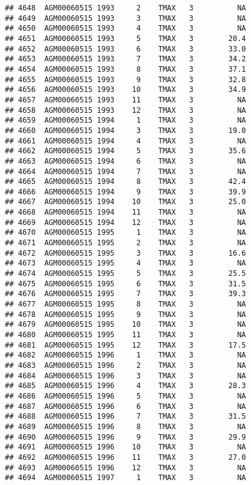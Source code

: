 \documentclass{article}\usepackage[]{graphicx}\usepackage[]{color}
\makeatletter
\newenvironment{kframe}{%
 \def\at@end@of@kframe{}%
 \ifinner\ifhmode%
  \def\at@end@of@kframe{\end{minipage}}%
  \begin{minipage}{\columnwidth}%
 \fi\fi%
 \def\FrameCommand##1{\hskip\@totalleftmargin \hskip-\fboxsep
 \colorbox{shadecolor}{##1}\hskip-\fboxsep
     \hskip-\linewidth \hskip-\@totalleftmargin \hskip\columnwidth}%
 \MakeFramed {\advance\hsize-\width
   \@totalleftmargin\z@ \linewidth\hsize
   \@setminipage}}%
 {\par\unskip\endMakeFramed%
 \at@end@of@kframe}
\newenvironment{knitrout}{}{} %
\makeatother
\begin{document}
\begin{knitrout}
\begin{kframe}
\begin{verbatim}
## 4648  AGM00060515 1993     2    TMAX   3          NA
## 4649  AGM00060515 1993     3    TMAX   3          NA
## 4650  AGM00060515 1993     4    TMAX   3          NA
## 4651  AGM00060515 1993     5    TMAX   3        20.4
## 4652  AGM00060515 1993     6    TMAX   3        33.0
## 4653  AGM00060515 1993     7    TMAX   3        34.2
## 4654  AGM00060515 1993     8    TMAX   3        37.1
## 4655  AGM00060515 1993     9    TMAX   3        32.8
## 4656  AGM00060515 1993    10    TMAX   3        34.9
## 4657  AGM00060515 1993    11    TMAX   3          NA
## 4658  AGM00060515 1993    12    TMAX   3          NA
## 4659  AGM00060515 1994     1    TMAX   3          NA
## 4660  AGM00060515 1994     3    TMAX   3        19.0
## 4661  AGM00060515 1994     4    TMAX   3          NA
## 4662  AGM00060515 1994     5    TMAX   3        35.6
## 4663  AGM00060515 1994     6    TMAX   3          NA
## 4664  AGM00060515 1994     7    TMAX   3          NA
## 4665  AGM00060515 1994     8    TMAX   3        42.4
## 4666  AGM00060515 1994     9    TMAX   3        39.9
## 4667  AGM00060515 1994    10    TMAX   3        25.0
## 4668  AGM00060515 1994    11    TMAX   3          NA
## 4669  AGM00060515 1994    12    TMAX   3          NA
## 4670  AGM00060515 1995     1    TMAX   3          NA
## 4671  AGM00060515 1995     2    TMAX   3          NA
## 4672  AGM00060515 1995     3    TMAX   3        16.6
## 4673  AGM00060515 1995     4    TMAX   3          NA
## 4674  AGM00060515 1995     5    TMAX   3        25.5
## 4675  AGM00060515 1995     6    TMAX   3        31.5
## 4676  AGM00060515 1995     7    TMAX   3        39.3
## 4677  AGM00060515 1995     8    TMAX   3          NA
## 4678  AGM00060515 1995     9    TMAX   3          NA
## 4679  AGM00060515 1995    10    TMAX   3          NA
## 4680  AGM00060515 1995    11    TMAX   3          NA
## 4681  AGM00060515 1995    12    TMAX   3        17.5
## 4682  AGM00060515 1996     1    TMAX   3          NA
## 4683  AGM00060515 1996     2    TMAX   3          NA
## 4684  AGM00060515 1996     3    TMAX   3          NA
## 4685  AGM00060515 1996     4    TMAX   3        28.3
## 4686  AGM00060515 1996     5    TMAX   3          NA
## 4687  AGM00060515 1996     6    TMAX   3          NA
## 4688  AGM00060515 1996     7    TMAX   3        31.5
## 4689  AGM00060515 1996     8    TMAX   3          NA
## 4690  AGM00060515 1996     9    TMAX   3        29.9
## 4691  AGM00060515 1996    10    TMAX   3          NA
## 4692  AGM00060515 1996    11    TMAX   3        27.0
## 4693  AGM00060515 1996    12    TMAX   3          NA
## 4694  AGM00060515 1997     1    TMAX   3          NA

\end{verbatim}
\end{kframe}
\end{knitrout}
\end{document}
